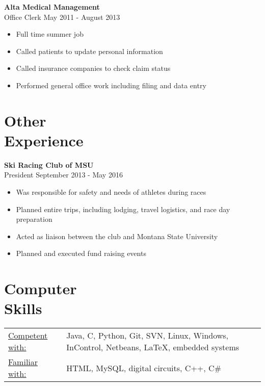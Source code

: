 \documentclass[margin]{res}
\begin{document}
\begin{resume}
\begin{itemize}
\end{itemize}

{\bf  Alta Medical Management}
\\Office Clerk           \hfill May 2011 - August 2013
\begin{itemize} \itemsep -2pt
\item Full time summer job
\item Called patients to update personal information
\item Called insurance companies to check claim status
\item Performed general office work including filing and data entry          
\end{itemize}

\noindent\makebox[\linewidth]{\rule{\paperwidth}{0.2pt}}
\section{Other \\ Experience}

{\bf  Ski Racing Club of MSU}  
\\President         \hfill  September 2013 - May 2016  
\begin{itemize} \itemsep -2pt
	\item Was responsible for safety and needs of athletes during races
	\item Planned entire trips, including lodging, travel logistics, and race day preparation
	\item Acted as liaison between the club and Montana State University 
	\item Planned and executed fund raising events
	          
\end{itemize}
  


\noindent\makebox[\linewidth]{\rule{\paperwidth}{0.2pt}}

\section{Computer \\ Skills}
   \begin{tabular}{l p{3in}}
    \underline{Competent with:} &  Java, C, Python, Git, SVN, Linux, Windows, InControl,  Netbeans, \LaTeX, embedded systems \\[1mm]
     \underline{Familiar with:} &  HTML, MySQL,  digital circuits, C++, C\#
 \end{tabular}
 

\end{resume}
\end{document}
